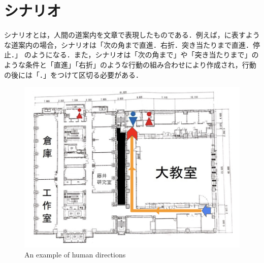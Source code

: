 \documentclass[../main]{subfiles}
\begin{document}
        \newpage

        \section{シナリオ}
            シナリオとは，人間の道案内を文章で表現したものである．例えば，に表すような道案内の場合，シナリオは「次の角まで直進．右折．突き当たりまで直進．停止．」
            のようになる．また，シナリオは「次の角まで」や「突き当たりまで」のような条件と「直進」「右折」のような行動の組み合わせにより作成され，行動の後には「．」をつけて区切る必要がある．
        
        \begin{figure}[H]
         \centering
         \includegraphics[width=12cm]{../images/scenario_fig}
         \caption{An example of human directions}
         \label{figure::scenario_exp}
        \end{figure}

        \newpage
          
\end{document}
